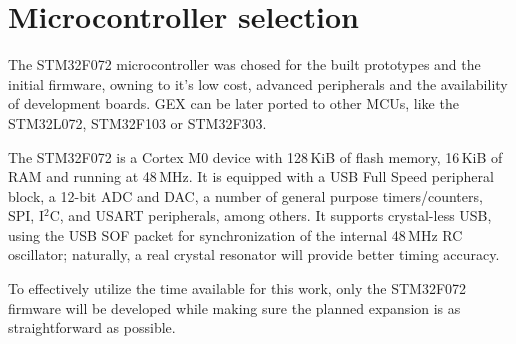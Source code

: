 \section{Microcontroller selection}

The STM32F072 microcontroller was chosed for the built prototypes and the initial firmware, owning to it's low cost, advanced peripherals and the availability of development boards. GEX can be later ported to other MCUs, like the STM32L072, STM32F103 or STM32F303. 

The STM32F072 is a Cortex M0 device with 128\,KiB of flash memory, 16\,KiB of RAM and running at 48\,MHz. It is equipped with a USB Full Speed peripheral block, a 12-bit ADC and DAC, a number of general purpose timers/counters, SPI, I$^2$C, and USART peripherals, among others. It supports crystal-less USB, using the USB SOF packet for synchronization of the internal 48\,MHz RC oscillator; naturally, a real crystal resonator will provide better timing accuracy.

To effectively utilize the time available for this work, only the STM32F072 firmware will be developed while making sure the planned expansion is as straightforward as possible.

